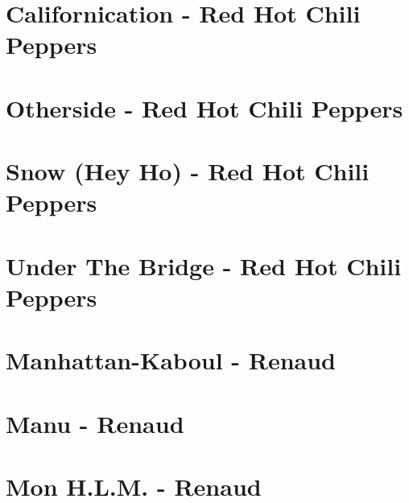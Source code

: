 \documentclass[11pt]{article}
\begin{document}
\section*{Californication - Red Hot Chili Peppers}
\begin{guitar}

\end{guitar}

\section*{Otherside - Red Hot Chili Peppers}
\begin{guitar}

\end{guitar}

\section{Snow  (Hey Ho) - Red Hot Chili Peppers}
\begin{guitar}

\end{guitar}

\section*{Under The Bridge - Red Hot Chili Peppers}
\begin{guitar}

\end{guitar}



\section{Manhattan-Kaboul - Renaud}
\begin{guitar}

\end{guitar}

\section{Manu - Renaud}
\begin{guitar}

\end{guitar}

\section*{Mon H.L.M. - Renaud}
\begin{guitar}

\end{guitar}
\end{document}
